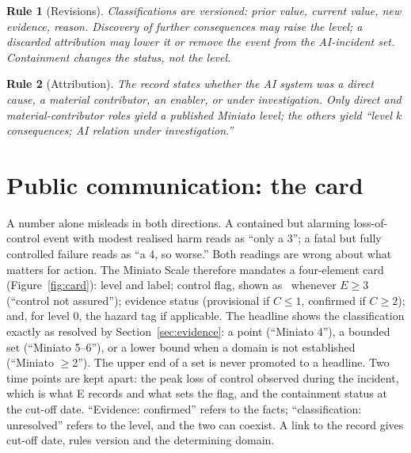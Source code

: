 \documentclass[11pt,a4paper]{article}
\newtheorem{rule_}{Rule}
\newcommand{\flag}{\fcolorbox{red!70!black}{red!10}{\textsf{\textbf{!}}}}
\begin{document}
\begin{rule_}[Revisions]
Classifications are versioned: prior value, current value, new evidence, reason. Discovery of further consequences may raise the level; a discarded attribution may lower it or remove the event from the AI-incident set. Containment changes the status, not the level.
\end{rule_}

\begin{rule_}[Attribution]
The record states whether the AI system was a direct cause, a material contributor, an enabler, or under investigation. Only direct and material-contributor roles yield a published Miniato level; the others yield ``level $k$ consequences; AI relation under investigation.''
\end{rule_}

\section{Public communication: the card}
\label{sec:card}

A number alone misleads in both directions. A contained but alarming loss-of-control event with modest realised harm reads as ``only a 3''; a fatal but fully controlled failure reads as ``a 4, so worse.'' Both readings are wrong about what matters for action. The Miniato Scale therefore mandates a four-element card (Figure~\ref{fig:card}): level and label; control flag, shown as \flag\ whenever $E \ge 3$ (``control not assured''); evidence status (provisional if $C \le 1$, confirmed if $C \ge 2$); and, for level 0, the hazard tag if applicable. The headline shows the classification exactly as resolved by Section~\ref{sec:evidence}: a point (``Miniato 4''), a bounded set (``Miniato 5--6''), or a lower bound when a domain is not established (``Miniato $\ge$2''). The upper end of a set is never promoted to a headline. Two time points are kept apart: the peak loss of control observed during the incident, which is what E records and what sets the flag, and the containment status at the cut-off date. ``Evidence: confirmed'' refers to the facts; ``classification: unresolved'' refers to the level, and the two can coexist. A link to the record gives cut-off date, rules version and the determining domain.
\end{document}
